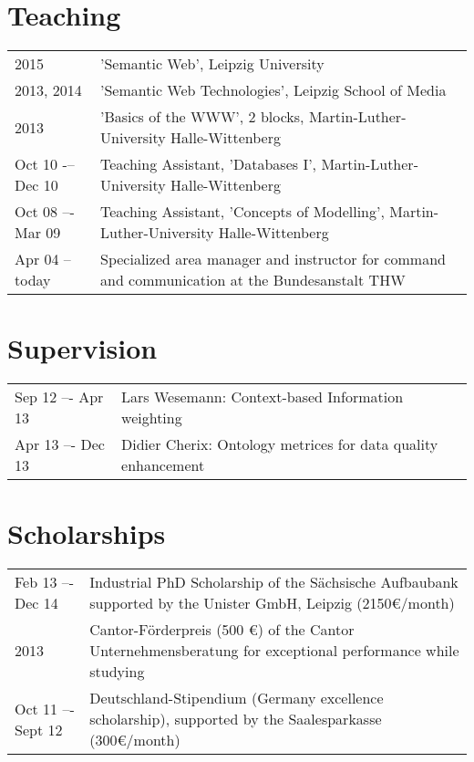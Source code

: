 \section*{Teaching}
\begin{tabular}{p{3cm}p{10cm}}	
2015		    & 'Semantic Web', Leipzig University\\
2013, 2014	    & 	'Semantic Web Technologies', Leipzig School of Media\\
2013		    & 'Basics of the WWW', 2 blocks, Martin-Luther-University Halle-Wittenberg\\
Oct 10 -– Dec 10	& 	Teaching Assistant, 'Databases I', Martin-Luther-University Halle-Wittenberg\\
Oct 08 –- Mar 09	& 	Teaching Assistant, 'Concepts of Modelling', Martin-Luther-University Halle-Wittenberg\\
Apr 04 -- today	& Specialized area manager and instructor for command and communication at the Bundesanstalt THW\\
\end{tabular}

\section*{Supervision}
\begin{tabular}{p{3cm}p{10cm}}	
Sep 12 –- Apr 13 	& 	Lars Wesemann: Context-based Information weighting\\
Apr 13 –- Dec 13 	& 	Didier Cherix: Ontology metrices for data quality enhancement
\end{tabular}

\section*{Scholarships}
\begin{tabular}{p{3cm}p{10cm}}	
Feb 13 –- Dec 14 	& 	Industrial PhD Scholarship of the Sächsische Aufbaubank supported by the Unister GmbH, Leipzig (2150€/month)\\
2013	        	&   Cantor-Förderpreis (500 €) of the Cantor Unternehmensberatung for exceptional performance while studying\\
Oct 11 –- Sept 12 	& 	Deutschland-Stipendium (Germany excellence scholarship), supported by the Saalesparkasse (300€/month)\\
\end{tabular}

